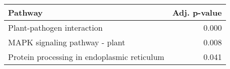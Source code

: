 \begin{tabular}{lr}
\toprule
                                     Pathway &  Adj. p-value \\
\midrule
                  Plant-pathogen interaction &         0.000 \\
              MAPK signaling pathway - plant &         0.008 \\
 Protein processing in endoplasmic reticulum &         0.041 \\
\bottomrule
\end{tabular}
